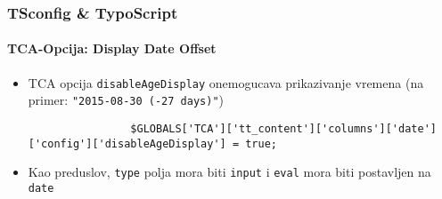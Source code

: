 \begin{frame}[fragile]
	\frametitle{TSconfig \& TypoScript}
	\framesubtitle{TCA-Opcija: Display Date Offset}

	\lstset{basicstyle=\tiny\ttfamily}

	\begin{itemize}

		\item TCA opcija \texttt{disableAgeDisplay} onemogucava prikazivanje vremena\newline
			\small
				(na primer: \texttt{"2015-08-30 (-27 days)"})
			\normalsize

			\begin{lstlisting}
				$GLOBALS['TCA']['tt_content']['columns']['date']['config']['disableAgeDisplay'] = true;
			\end{lstlisting}

		\item Kao preduslov, \texttt{type} polja mora biti \texttt{input}
			i \texttt{eval} mora biti postavljen na \texttt{date}

	\end{itemize}

\end{frame}


